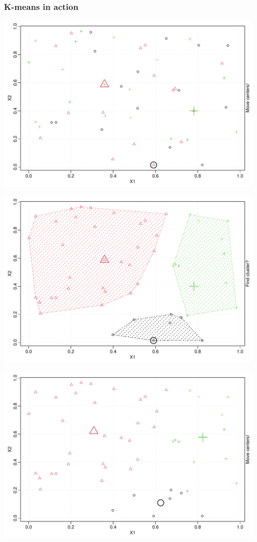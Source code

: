 \documentclass{beamer}\usepackage[]{graphicx}\usepackage[]{color}
\newenvironment{knitrout}{}{} %
\begin{document}
\begin{frame}
\frametitle{K-means in action}

\begin{knitrout}\scriptsize
{}\color{fgcolor}
\includegraphics[width=.8\textwidth]{figures/unnamed-chunk-1-1} 

\includegraphics[width=.8\textwidth]{figures/unnamed-chunk-1-2} 

\includegraphics[width=.8\textwidth]{figures/unnamed-chunk-1-3} 


\end{knitrout}
\end{frame}
\end{document}
